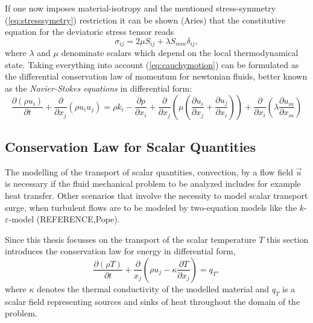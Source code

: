     If one now imposes material-isotropy and the mentioned stress-symmetry (\ref{eq:stresssymetry}) restriction it can be shown (Aries) that the constitutive equation for the deviatoric stress tensor reads 
    \begin{displaymath}
      \sigma_{ij} = 2 \mu S_{ij} + \lambda S_{mm} \delta_{ij},
    \end{displaymath}
    where \(\lambda\) and \(\mu\) denominate scalars which depend on the local thermodynamical state. Taking everything into account (\ref{eq:cauchymotion}) can be formulated as the differential conservation law of momentum for newtonian fluids, better known as the \emph{Navier-Stokes equations} in differential form:
    \begin{equation}
      \label{eq:nsfull}
      \frac{\partial \left(\rho u_i \right)}{\partial t} 
      + \frac{\partial}{\partial x_j} \left( \rho u_i  u_j \right) 
      = \rho k_i
      - \frac{\partial p}{\partial x_i}
      + \frac{\partial}{\partial x_j} \left( \mu  \left( \frac{\partial u_i}{\partial x_j} 
                                              + \frac{\partial u_j}{\partial x_i} \right) \right)
      + \frac{\partial}{\partial x_i} \left(\lambda \frac{\partial u_m}{\partial x_m} \right)
    \end{equation}

    \subsection{Conservation Law for Scalar Quantities}

    The modelling of the transport of scalar quantities, convection, by a flow field \(\vec{u}\) is necessary if the fluid mechanical problem to be analyzed includes for example heat transfer. Other scenarios that involve the necessity to model scalar transport surge, when turbulent flows are to be modeled by two-equation models like the \(k\)-\(\varepsilon\)-model (REFERENCE,Pope). 
    
    Since this thesis focusses on the transport of the scalar temperature \(T\) this section introduces the conservation law for energy in differential form,
    \begin{equation}
      \frac{\partial \left(\rho T \right)}{\partial t} + \frac{\partial}{x_j} \left( \rho u_j - \kappa \frac{\partial T}{\partial x_j} \right) = q_T,
    \end{equation}
    where \(\kappa\) denotes the thermal conductivity of the modelled material and \(q_T\) is a scalar field representing sources and sinks of heat throughout the domain of the problem. 

